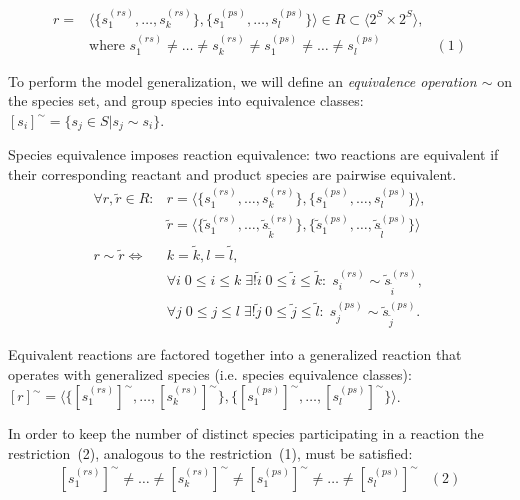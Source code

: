 \documentclass[10pt]{bmc_article}
\newenvironment{bmcformat}{\baselineskip20pt\sloppy\setboolean{publ}{false}}{\baselineskip20pt\sloppy}
\begin{document}
\begin{bmcformat}
\[ \begin{array}{llr}
\mbox{$r = $} & \mbox{$\langle\{s^{(rs)}_1, \ldots, s^{(rs)}_k\},\{s^{(ps)}_1, \ldots, s^{(ps)}_l\}\rangle
\in R \subset \langle 2^S \times 2^S \rangle$}, &\\
& \mbox{where } \mbox{$s^{(rs)}_1 \neq \ldots \neq s^{(rs)}_k \neq s^{(ps)}_1 \neq \ldots \neq s^{(ps)}_l$}  & (1)
\end{array} \]

To perform the model generalization, we will define an \emph{equivalence operation $\sim$} on the species set, and group species into equivalence classes: $[s_i]^{\sim} = \{s_j \in S | s_j \sim s_i\}$.

Species equivalence imposes reaction equivalence: two reactions are equivalent if their corresponding reactant and product species are pairwise equivalent.
\[ \begin{array}{ll}
\mbox{$\forall r, \tilde{r} \in R:$} &  \mbox{$r = \langle\{s^{(rs)}_1, \ldots, s^{(rs)}_k\},\{s^{(ps)}_1, \ldots, s^{(ps)}_l\}\rangle,$}\\
& \mbox{$\tilde{r} = \langle\{\tilde{s}^{(rs)}_1, \ldots, \tilde{s}^{(rs)}_{\tilde{k}}\},\{\tilde{s}^{(ps)}_1, \ldots, \tilde{s}^{(ps)}_{\tilde{l}}\}\rangle$}\\
\mbox{$r \sim \tilde{r} \iff $} & \mbox{$k = \tilde{k}, l = \tilde{l}$}, \\
& \mbox{$\forall i\; 0\leq{i}\leq{k} \; \exists{!} \tilde{i}\; 0\leq \tilde{i}\leq \tilde{k}:\; s^{(rs)}_i \sim \tilde{s}^{(rs)}_{\tilde{i}}$}, \\
& \mbox{$\forall j\;0\leq j\leq l\;\exists{!} \tilde{j}\;0\leq \tilde{j}\leq\tilde{l}:\;s^{(ps)}_j \sim \tilde{s}^{(ps)}_{\tilde{j}}$}. 
\end{array} \]

Equivalent reactions are factored together into a generalized reaction that operates with generalized species (i.e. species equivalence classes): 
$[r]^{\sim} = \langle\{[s^{(rs)}_1]^{\sim}, \ldots, [s^{(rs)}_k]^{\sim}\}, \{[s^{(ps)}_1]^{\sim}, \ldots, [s^{(ps)}_l]^{\sim}\}\rangle$.

In order to keep the number of distinct species participating in a reaction the restriction~(2), analogous to the restriction~(1), must be satisfied:
\[ \begin{array}{lr}
\mbox{$[s^{(rs)}_1]^{\sim} \neq \ldots \neq [s^{(rs)}_k]^{\sim} \neq [s^{(ps)}_1]^{\sim} \neq \ldots \neq [s^{(ps)}_l]^{\sim}$} & (2)
\end{array} \]


\end{bmcformat}
\end{document}
